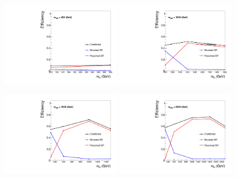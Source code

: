 \begin{figure}[htbp]
  \centering

  \includegraphics[width=0.45\textwidth]{figures/SigEff/WR400.pdf}
  \hspace{0.01\textwidth}
  \includegraphics[width=0.45\textwidth]{figures/SigEff/WR1000.pdf}
  \vspace{0.01\textwidth}

  \includegraphics[width=0.45\textwidth]{figures/SigEff/WR1600.pdf}
  \hspace{0.01\textwidth}
  \includegraphics[width=0.45\textwidth]{figures/SigEff/WR2200.pdf}
  \vspace{0.01\textwidth}


\end{figure}
